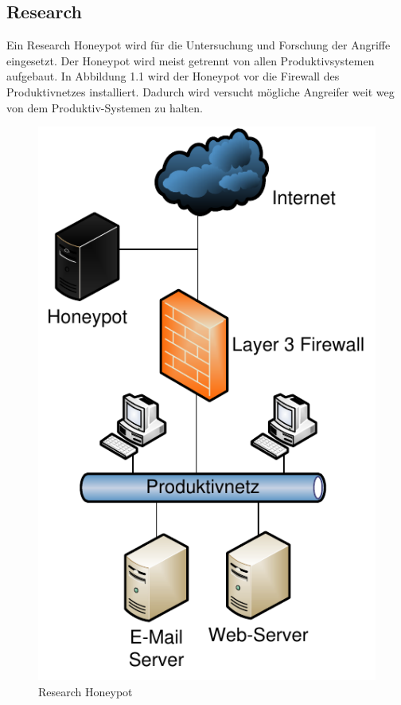 \subsection{Research}

Ein Research Honeypot wird für die Untersuchung und Forschung der Angriffe eingesetzt. Der Honeypot wird meist getrennt von allen Produktivsystemen aufgebaut. In Abbildung 1.1 wird der Honeypot vor die Firewall des Produktivnetzes installiert. Dadurch wird versucht mögliche Angreifer weit weg von dem Produktiv-Systemen zu halten. 
\\
\begin{figure}[ht]
    \centering\includegraphics[scale=0.6]{Bilder/Research_1.pdf}
  \caption{Research Honeypot}
  \label{hnet:geni}
\end{figure}



